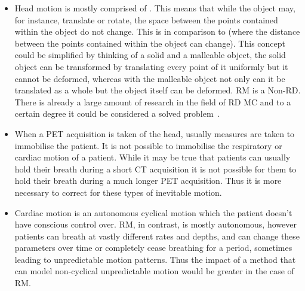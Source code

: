         \begin{itemize}
            \item Head motion is mostly comprised of . This means that while the object may, for instance, translate or rotate, the space between the points contained within the object do not change. This is in comparison to  (where the distance between the points contained within the object can change). This concept could be simplified by thinking of a solid and a malleable object, the solid object can be transformed by translating every point of it uniformly but it cannot be deformed, whereas with the malleable object not only can it be translated as a whole but the object itself can be deformed. \gls{RM} is a \gls{Non-RD}. There is already a large amount of research in the field of \gls{RD} \gls{MC} and to a certain degree it could be considered a solved problem~\parencite{Hill2001}.
                
            \item When a \gls{PET} acquisition is taken of the head, usually measures are taken to immobilise the patient. It is not possible to immobilise the respiratory or cardiac motion of a patient. While it may be true that patients can usually hold their breath during a short \gls{CT} acquisition it is not possible for them to hold their breath during a much longer \gls{PET} acquisition. Thus it is more necessary to correct for these types of inevitable motion.
    
            \item Cardiac motion is an autonomous cyclical motion which the patient doesn't have conscious control over. \gls{RM}, in contrast, is mostly autonomous, however patients can breath at vastly different rates and depths, and can change these parameters over time or completely cease breathing for a period, sometimes leading to unpredictable motion patterns. %
            Thus the impact of a method that can model non-cyclical unpredictable motion would be greater in the case of \gls{RM}.
        \end{itemize}
    
